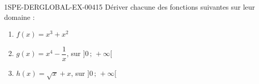 \begin{exercice}{1SPE-DERGLOBAL-EX-004}{1}{5}
Dériver chacune des fonctions suivantes sur leur domaine :
\begin{enumerate}
  \item $f(x) = x^3 + x^2$
  \item $g(x) = x^4 - \dfrac{1}{x}$, sur $]0\,;\,+\infty[$
  \item $h(x) = \sqrt{x} + x$, sur $]0\,;\,+\infty[$
\end{enumerate}
\end{exercice}
